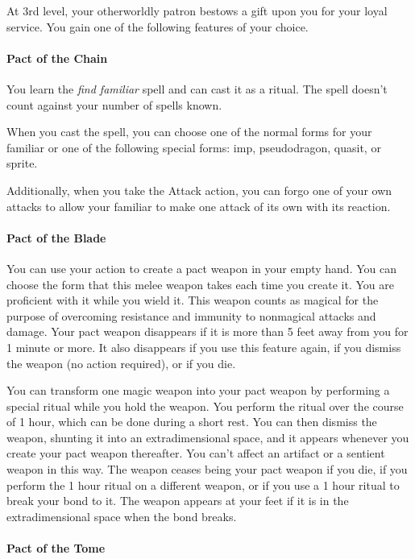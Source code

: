 \documentclass[
]{article}
\begin{document}
At 3rd level, your otherworldly patron bestows a gift upon you for your
loyal service. You gain one of the following features of your choice.

\hypertarget{pact-of-the-chain}{%
\paragraph{Pact of the Chain}\label{pact-of-the-chain}}

You learn the \emph{find familiar} spell and can cast it as a ritual.
The spell doesn't count against your number of spells known.

When you cast the spell, you can choose one of the normal forms for your
familiar or one of the following special forms: imp, pseudodragon,
quasit, or sprite.

Additionally, when you take the Attack action, you can forgo one of your
own attacks to allow your familiar to make one attack of its own with
its reaction.

\hypertarget{pact-of-the-blade}{%
\paragraph{Pact of the Blade}\label{pact-of-the-blade}}

You can use your action to create a pact weapon in your empty hand. You
can choose the form that this melee weapon takes each time you create
it. You are proficient with it while you wield it. This weapon counts as
magical for the purpose of overcoming resistance and immunity to
nonmagical attacks and damage. Your pact weapon disappears if it is more
than 5 feet away from you for 1 minute or more. It also disappears if
you use this feature again, if you dismiss the weapon (no action
required), or if you die.

You can transform one magic weapon into your pact weapon by performing a
special ritual while you hold the weapon. You perform the ritual over
the course of 1 hour, which can be done during a short rest. You can
then dismiss the weapon, shunting it into an extradimensional space, and
it appears whenever you create your pact weapon thereafter. You can't
affect an artifact or a sentient weapon in this way. The weapon ceases
being your pact weapon if you die, if you perform the 1 hour ritual on a
different weapon, or if you use a 1 hour ritual to break your bond to
it. The weapon appears at your feet if it is in the extradimensional
space when the bond breaks.

\hypertarget{pact-of-the-tome}{%
\paragraph{Pact of the Tome}\label{pact-of-the-tome}}
\end{document}
